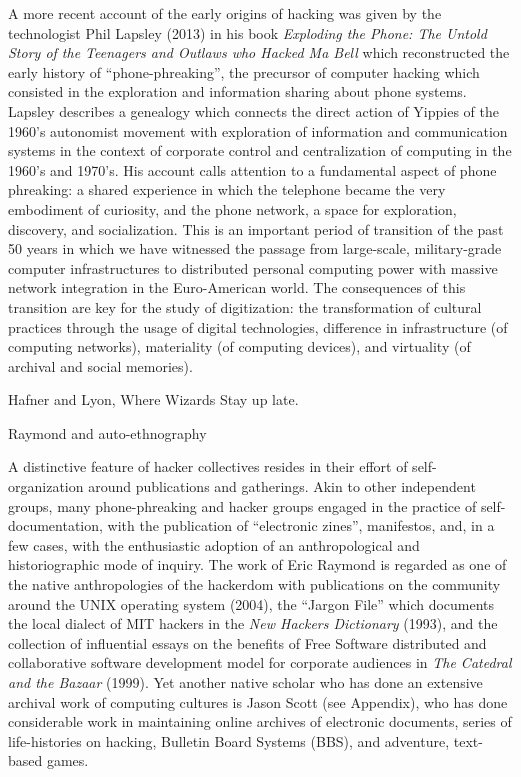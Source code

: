 \documentclass[10pt,letter,oneside]{scrartcl}
\begin{document}
A more recent account of the early origins of hacking was given by the
technologist Phil Lapsley (2013) in his book \emph{Exploding the Phone:
The Untold Story of the Teenagers and Outlaws who Hacked Ma Bell} which
reconstructed the early history of ``phone-phreaking'', the precursor
of computer hacking which consisted in the exploration and information
sharing about phone systems.  Lapsley describes a genealogy which connects 
the direct action of Yippies of the 1960's autonomist movement with exploration 
of information and communication systems in the context of corporate control and centralization of computing in the 1960's and 1970's.  His account calls 
attention to a fundamental aspect of phone phreaking: a shared experience in 
which the telephone became the very embodiment of curiosity, and the phone 
network, a space for exploration, discovery, and socialization.  This is an 
important period of transition of the past 50 years in which we have witnessed 
the passage from large-scale, military-grade computer infrastructures to distributed
personal computing power with massive network integration in the Euro-American
world. The consequences of this transition are key for the study of
digitization: the transformation of cultural practices through the usage of
digital technologies, difference in infrastructure (of computing networks),
materiality (of computing devices), and virtuality (of archival and social
memories).

Hafner and Lyon, Where Wizards Stay up late. 

Raymond and auto-ethnography

A distinctive feature of hacker collectives resides in their effort of self-organization
around publications and gatherings.  Akin to other independent groups, many 
phone-phreaking and hacker groups engaged in the practice of self-documentation,
with the publication of ``electronic zines'', manifestos, and, in a few cases, 
with the enthusiastic adoption of an anthropological and historiographic mode of 
inquiry.  The work of Eric Raymond is regarded as one of the native anthropologies
of the hackerdom with publications on the community around the UNIX operating system
(2004), the ``Jargon File'' which documents the local dialect of MIT hackers in the \emph{New Hackers Dictionary} (1993), and the collection of influential essays on the benefits of Free Software distributed and collaborative software development model for corporate audiences in \emph{The Catedral and the Bazaar} (1999).  Yet another native scholar who has done an extensive archival work of computing cultures is Jason Scott 
(see Appendix), who has done considerable work in maintaining online archives of 
electronic documents, series of life-histories on hacking, Bulletin Board Systems (BBS),
and adventure, text-based games.
\end{document}
